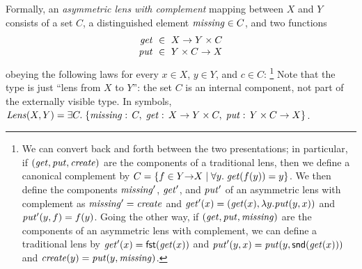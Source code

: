 Formally, an {\em asymmetric lens with complement}
mapping between $X$ and $Y$ consists of a set $C$, a
distinguished element $\mathit{missing} \in C$, and two functions
\[
\begin{array}{r@{\ \;}c@{\ \;}l}
\GET &\in& X \arrow Y \times C\\
\PUT &\in& Y \times C \arrow X
\end{array}
\]
obeying the following laws for every $x \in X$, $y \in Y$, and $c \in C$:%
\footnote{We can convert back and
forth between the two presentations; in particular, if $(\mathit{get}, \mathit{put},
\mathit{create})$ are the components of a traditional lens, then we define a
canonical complement by $C=\{f\in Y{\rightarrow}X\mid \forall
y.\;\mathit{get}(f(y))=y\}$. We then define the components $\mathit{missing}'$, $\mathit{get}'$, and
$\mathit{put}'$ 
of an asymmetric lens with complement as $\mathit{missing}'=\mathit{create}$ and
$\mathit{get}'(x)=(\mathit{get}(x),\lambda y.\mathit{put}(y,x))$ and $\mathit{put}'(y,f)=f(y)$.
\iffull
Going the other way, if $(\mathit{get}, \mathit{put}, \mathit{missing})$ are the components of an
asymmetric lens with complement, we can define a traditional lens by
$\mathit{get}'(x) = \mathsf{fst}(\mathit{get}(x))$ and $\mathit{put}'(y,x) = \mathit{put}(y,\mathsf{snd}(\mathit{get}(x)))$
and $\mathit{create}(y) = \mathit{put}(y,\mathit{missing})$.
\fi
}
%
Note that the type is just ``lens from $X$ to $Y$'': the set
$C$ is an internal component, not part of the externally visible type.
In symbols, $ \mathit{Lens}(X,Y) =
\exists C.\; \{ \mathord{\mathit{missing}}:\, C,\; \mathit{get}:\,X \rightarrow Y
\times C,\; \mathit{put}:\,Y \times C \rightarrow X \}$.

